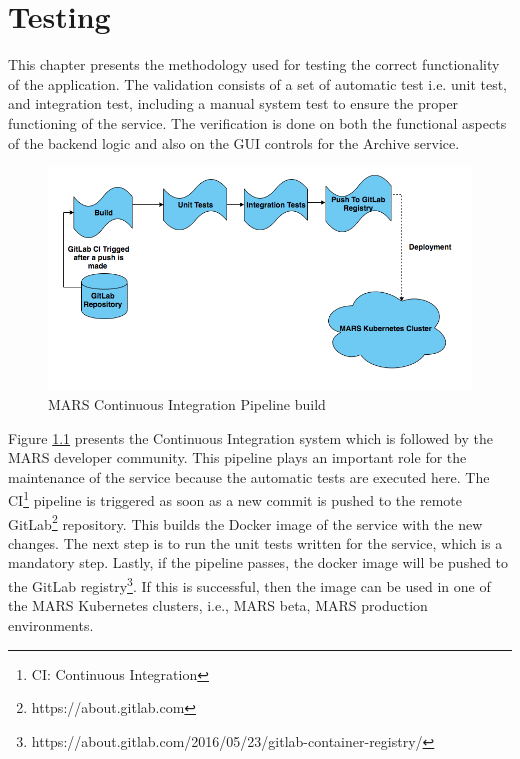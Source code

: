 \chapter{Testing}
\label{chap:testing}
This chapter presents the methodology used for testing the correct functionality of the application. The validation consists of a set of automatic test i.e.
unit test, and integration test, including a manual system test to ensure the proper functioning of the service. The verification is done on both the functional
aspects of the backend logic and also on the GUI controls for the Archive service.

\begin{figure}[H]
    \centering \includegraphics[scale=0.5]{grafiken/CIbuild.png}
    \caption{MARS Continuous Integration Pipeline build}
    \label{fig:CIbuild}
\end{figure}

Figure \ref{fig:CIbuild} presents the Continuous Integration system which is followed by the MARS developer community. This pipeline plays an important role
for the maintenance of the service because the automatic tests are executed here.
The CI\footnote{CI: Continuous Integration} pipeline is triggered as soon as a new commit is pushed to the remote 
GitLab\footnote{https://about.gitlab.com} repository. This builds the Docker image of the service with the new changes. The next step is to
run the unit tests written for the service, which is a mandatory step. Lastly, if the pipeline passes, the docker image will be pushed
to the GitLab registry\footnote{https://about.gitlab.com/2016/05/23/gitlab-container-registry/}. If this is successful, then the image can be used in one of 
the MARS Kubernetes clusters, i.e., MARS beta, MARS production environments. 




